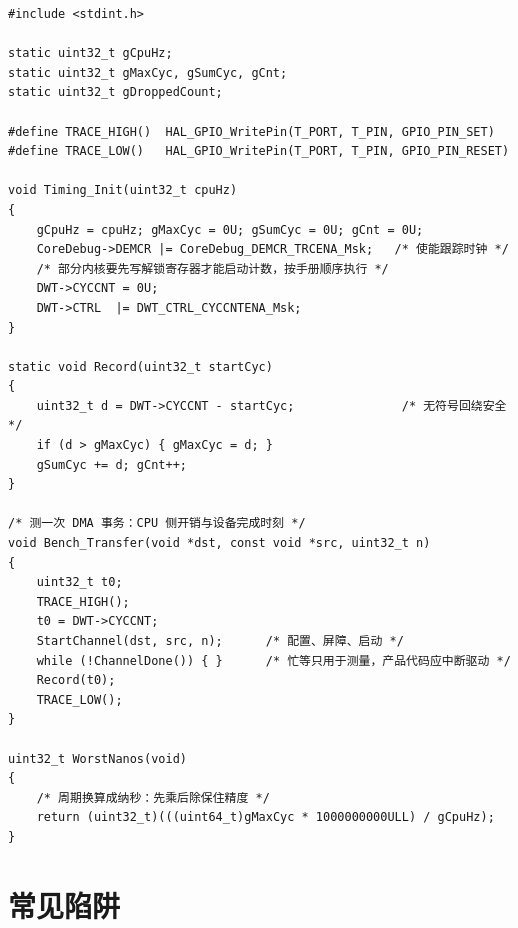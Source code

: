 \documentclass[12pt,a4paper,fontset=fandol]{ctexbook}
\begin{document}
\begin{lstlisting}[style=cstyle,caption={C：用 DWT 周期计数器与 GPIO 翻转给搬运打点},label={lst:ch05-dwt-timing}]
#include <stdint.h>

static uint32_t gCpuHz;
static uint32_t gMaxCyc, gSumCyc, gCnt;
static uint32_t gDroppedCount;

#define TRACE_HIGH()  HAL_GPIO_WritePin(T_PORT, T_PIN, GPIO_PIN_SET)
#define TRACE_LOW()   HAL_GPIO_WritePin(T_PORT, T_PIN, GPIO_PIN_RESET)

void Timing_Init(uint32_t cpuHz)
{
    gCpuHz = cpuHz; gMaxCyc = 0U; gSumCyc = 0U; gCnt = 0U;
    CoreDebug->DEMCR |= CoreDebug_DEMCR_TRCENA_Msk;   /* 使能跟踪时钟 */
    /* 部分内核要先写解锁寄存器才能启动计数，按手册顺序执行 */
    DWT->CYCCNT = 0U;
    DWT->CTRL  |= DWT_CTRL_CYCCNTENA_Msk;
}

static void Record(uint32_t startCyc)
{
    uint32_t d = DWT->CYCCNT - startCyc;               /* 无符号回绕安全 */
    if (d > gMaxCyc) { gMaxCyc = d; }
    gSumCyc += d; gCnt++;
}

/* 测一次 DMA 事务：CPU 侧开销与设备完成时刻 */
void Bench_Transfer(void *dst, const void *src, uint32_t n)
{
    uint32_t t0;
    TRACE_HIGH();
    t0 = DWT->CYCCNT;
    StartChannel(dst, src, n);      /* 配置、屏障、启动 */
    while (!ChannelDone()) { }      /* 忙等只用于测量，产品代码应中断驱动 */
    Record(t0);
    TRACE_LOW();
}

uint32_t WorstNanos(void)
{
    /* 周期换算成纳秒：先乘后除保住精度 */
    return (uint32_t)(((uint64_t)gMaxCyc * 1000000000ULL) / gCpuHz);
}
\end{lstlisting}

\section{常见陷阱}
\end{document}
